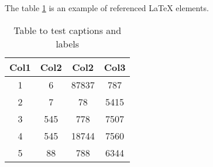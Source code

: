 \documentclass{article}
\begin{document}
The table \ref{table:1} is an example of referenced \LaTeX{} elements.

\begin{table}[h!]
\centering
 \begin{tabular}{||c c c c||} 
 \hline
 Col1 & Col2 & Col2 & Col3 \\ [0.5ex] 
 \hline\hline
 1 & 6 & 87837 & 787 \\ 
 2 & 7 & 78 & 5415 \\
 3 & 545 & 778 & 7507 \\
 4 & 545 & 18744 & 7560 \\
 5 & 88 & 788 & 6344 \\ [1ex] 
 \hline
 \end{tabular}
 \caption{Table to test captions and labels}
 \label{table:1}
\end{table}
\end{document}
